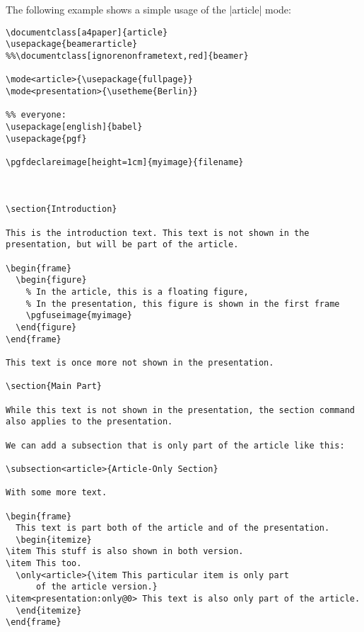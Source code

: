 The following example shows a simple usage of the |article| mode:

\begin{verbatim}
\documentclass[a4paper]{article}
\usepackage{beamerarticle}
%%\documentclass[ignorenonframetext,red]{beamer}

\mode<article>{\usepackage{fullpage}}
\mode<presentation>{\usetheme{Berlin}}

%% everyone:
\usepackage[english]{babel}
\usepackage{pgf}

\pgfdeclareimage[height=1cm]{myimage}{filename}



\section{Introduction}

This is the introduction text. This text is not shown in the
presentation, but will be part of the article.

\begin{frame}
  \begin{figure}
    % In the article, this is a floating figure,
    % In the presentation, this figure is shown in the first frame
    \pgfuseimage{myimage}
  \end{figure}
\end{frame}

This text is once more not shown in the presentation.

\section{Main Part}

While this text is not shown in the presentation, the section command
also applies to the presentation.

We can add a subsection that is only part of the article like this:

\subsection<article>{Article-Only Section}

With some more text.

\begin{frame}
  This text is part both of the article and of the presentation.
  \begin{itemize}
\item This stuff is also shown in both version.
\item This too.
  \only<article>{\item This particular item is only part
      of the article version.}
\item<presentation:only@0> This text is also only part of the article.
  \end{itemize}
\end{frame}

\end{verbatim}

